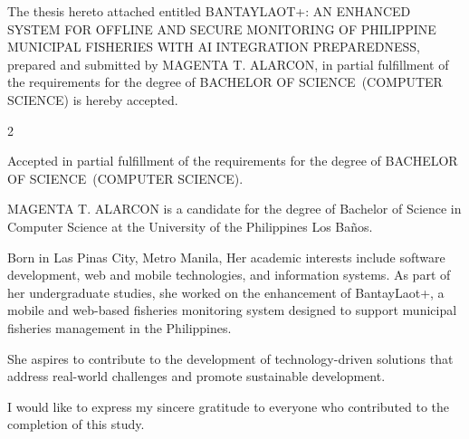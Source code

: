 \documentclass{icsthesis}
\renewcommand{\TITLE}{BANTAYLAOT+: AN ENHANCED SYSTEM FOR OFFLINE AND SECURE MONITORING OF PHILIPPINE MUNICIPAL FISHERIES WITH AI INTEGRATION PREPAREDNESS}
\renewcommand{\AUTHOR}{MAGENTA T. ALARCON}
\renewcommand{\DEGREE}{BACHELOR OF SCIENCE}
\renewcommand{\MAJOR}{COMPUTER SCIENCE}
\begin{document}
	
	\begin{frontmatter}
		\maketitle
				
		\begin{approvalpage}
			The thesis hereto attached entitled \TITLE , prepared and submitted by \AUTHOR , in partial fulfillment of the requirements for the degree of \DEGREE\ (\MAJOR) is hereby accepted.
			
			\begin{multicols}{2}
				\centering
				\columnbreak
			\end{multicols}
			
			Accepted in partial fulfillment of the requirements for the degree of \DEGREE\ (\MAJOR). 
		\end{approvalpage}
		
		\begin{biosketch}
			{\AUTHOR} is  a candidate for the degree of Bachelor of Science in Computer Science at the University of the Philippines Los Baños. 
            
            Born in Las Pinas City, Metro Manila, Her academic interests include software development, web and mobile technologies, and information systems. As part of her undergraduate studies, she worked on the enhancement of BantayLaot+, a mobile and web-based fisheries monitoring system designed to support municipal fisheries management in the Philippines.

            She aspires to contribute to the development of technology-driven solutions that address real-world challenges and promote sustainable development.

            
			\addauthorsignaturefield
		\end{biosketch}	
		
		\begin{acknowledgement}
			I would like to express my sincere gratitude to everyone who contributed to the completion of this study.


\end{acknowledgement}
\end{frontmatter}
\end{document}
